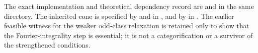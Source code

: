 The exact implementation and theoretical dependency record are
and  in the same directory.  The inherited cone is
specified by  and  in
,
and by  in
.
The earlier feasible witness for the weaker odd-class relaxation
is retained only to show that the Fourier-integrality step is
essential; it is not a categorification or a survivor of the
strengthened conditions.
